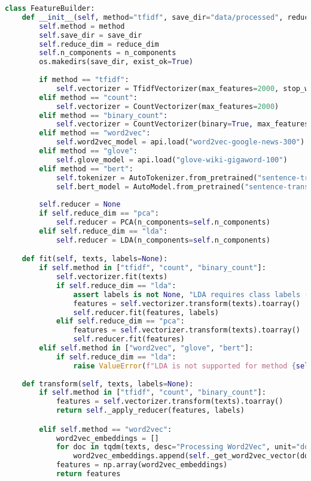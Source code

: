 \begin{lstlisting}[language=Python]
class FeatureBuilder:
    def __init__(self, method="tfidf", save_dir="data/processed", reduce_dim=None, n_components=100):
        self.method = method
        self.save_dir = save_dir
        self.reduce_dim = reduce_dim
        self.n_components = n_components
        os.makedirs(save_dir, exist_ok=True)
        
        if method == "tfidf":
            self.vectorizer = TfidfVectorizer(max_features=2000, stop_words="english")
        elif method == "count":
            self.vectorizer = CountVectorizer(max_features=2000)
        elif method == "binary_count":
            self.vectorizer = CountVectorizer(binary=True, max_features=2000)
        elif method == "word2vec":
            self.word2vec_model = api.load("word2vec-google-news-300")  
        elif method == "glove":
            self.glove_model = api.load("glove-wiki-gigaword-100")      
        elif method == "bert":
            self.tokenizer = AutoTokenizer.from_pretrained("sentence-transformers/all-MiniLM-L6-v2")
            self.bert_model = AutoModel.from_pretrained("sentence-transformers/all-MiniLM-L6-v2")
    
        self.reducer = None
        if self.reduce_dim == "pca":
            self.reducer = PCA(n_components=self.n_components)
        elif self.reduce_dim == "lda":
            self.reducer = LDA(n_components=self.n_components)

    def fit(self, texts, labels=None):
        if self.method in ["tfidf", "count", "binary_count"]:
            self.vectorizer.fit(texts)
            if self.reduce_dim == "lda":
                assert labels is not None, "LDA requires class labels (y)."
                features = self.vectorizer.transform(texts).toarray()
                self.reducer.fit(features, labels)
            elif self.reduce_dim == "pca":
                features = self.vectorizer.transform(texts).toarray()
                self.reducer.fit(features)
        elif self.method in ["word2vec", "glove", "bert"]:
            if self.reduce_dim == "lda":
                raise ValueError(f"LDA is not supported for method {self.method}")
            
    def transform(self, texts, labels=None):
        if self.method in ["tfidf", "count", "binary_count"]:
            features = self.vectorizer.transform(texts).toarray()
            return self._apply_reducer(features, labels)

        elif self.method == "word2vec":
            word2vec_embeddings = []
            for doc in tqdm(texts, desc="Processing Word2Vec", unit="document"):
                word2vec_embeddings.append(self._get_word2vec_vector(doc))
            features = np.array(word2vec_embeddings)
            return features


\end{lstlisting}
